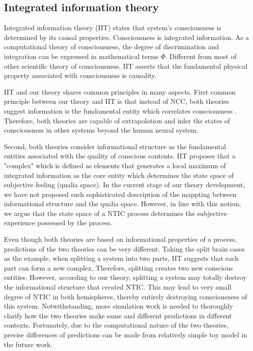 \documentclass[utf8]{article}
\begin{document}
		\subsection{Integrated information theory}
		Integrated information theory (IIT) states that system's consciousness is determined by its causal properties. Consciousness is integrated information. As a computational theory of consciousness, the degree of discrimination and integration can be expressed in mathematical terms $\Phi$. Different from most of other scientific theory of consciousness, IIT asserts that the fundamental physical property associated with consciousness is causality.
		
		IIT and our theory shares common principles in many aspects. First common principle between our theory and IIT is that instead of NCC, both theories suggest information is the fundamental entity which correlates consciousness . Therefore, both theories are capable of extrapolation and infer the states of consciousness in other systems beyond the human neural system.
		
		Second, both theories consider informational structure as the fundamental entities associated with the quality of conscious contents. IIT proposes that a "complex" which is defined as elements that generates a local maximum of integrated information as the core entity which determines the state space of subjective feeling (qualia space). In the current stage of our theory development, we have not proposed such sophisticated description of the mappting between informational structure and the qualia space. However, in line with this notion, we argue that the state space of a NTIC process determines the subjective experience possessed by the process. 
		
		
		
		
		Even though both theories are based on informational properties of a process, predictions of the two theories can be very different. Taking the split brain cases as the example, when splitting a system into two parts, IIT suggests that each part can form a new complex. Therefore, splitting creates two new conscious entities. However, according to our theory, splitting a system may totally destroy the informational structure that created NTIC. This may lead to very small degree of NTIC in both hemispheres, thereby entirely destroying consciousness of this system. Notwithstanding, more simulation work is needed to thoroughly clarify how the two theories make same and different predictions in different contexts. Fortunately, due to the computational nature of the two theories, precise differences of predictions can be made from relatively simple toy model in the future work. 
		
\end{document}
